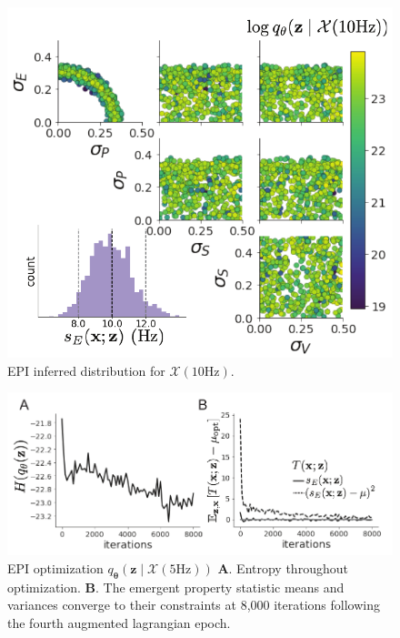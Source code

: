\documentclass[11pt]{article}
\begin{document}
\begin{figure}[h]
\caption{EPI inferred distribution for $\mathcal{X}(10\text{Hz})$.
 }
 \label{fig:V1_1}
\begin{center}
\includegraphics[scale=.8]{figures/figV1_3/figV1_3.pdf}
\end{center}
\end{figure}

\begin{figure}[h]
\caption{EPI optimization $q_{\bm{\theta}}(\mathbf{z} \mid \mathcal{X}(5\text{Hz}))$
\textbf{A}. Entropy throughout optimization. 
\textbf{B}. The emergent property statistic means and variances converge to their constraints at 8,000 iterations following the fourth augmented lagrangian epoch.
 }
 \label{fig:V1_2}
\begin{center}
\includegraphics[scale=.8]{figures/figV1_4/figV1_4.pdf}
\end{center}
\end{figure}
\end{document}
